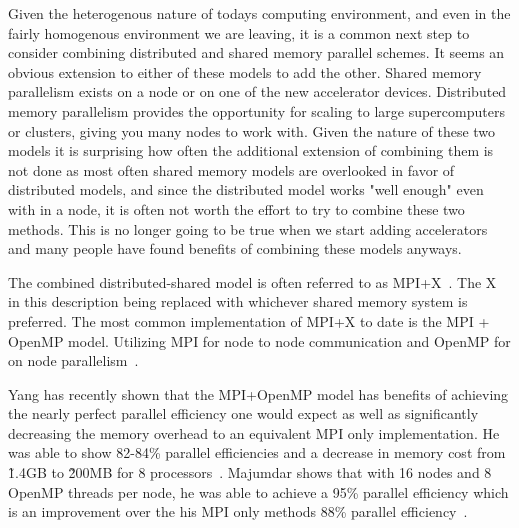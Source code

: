 %
Given the heterogenous nature of todays computing environment, and even in the fairly homogenous environment we are leaving, it is a common next step to consider combining distributed and shared memory parallel schemes.
%
It seems an obvious extension to either of these models to add the other.
%
Shared memory parallelism exists on a node or on one of the new accelerator devices.
%
Distributed memory parallelism provides the opportunity for scaling to large supercomputers or clusters, giving you many nodes to work with.
%
Given the nature of these two models it is surprising how often the additional extension of combining them is not done as most often shared memory models are overlooked in favor of distributed models, and since the distributed model works "well enough" even with in a node, it is often not worth the effort to try to combine these two methods.
%
This is no longer going to be true when we start adding accelerators and many people have found benefits of combining these models anyways.
%

%
The combined distributed-shared model is often referred to as MPI+X~\cite{michaelwolfe2014}.
%
The X in this description being replaced with whichever shared memory system is preferred.
%
The most common implementation of MPI+X to date is the MPI + OpenMP model.
%
Utilizing MPI for node to node communication and OpenMP for on node parallelism~\cite{michaelwolfe2014}.
%

%
Yang has recently shown that the MPI+OpenMP model has benefits of achieving the nearly perfect parallel efficiency one would expect as well as significantly decreasing the memory overhead to an equivalent MPI only implementation.
%
He was able to show 82-84\% parallel efficiencies and a decrease in memory cost from \~1.4GB to \~200MB for 8 processors~\cite{yanghybrid}.
%
Majumdar shows that with 16 nodes and 8 OpenMP threads per node, he was able to achieve a 95\% parallel efficiency which is an improvement over the his MPI only methods 88\% parallel efficiency~\cite{majumdar2000parallel}. 
%

%


%
